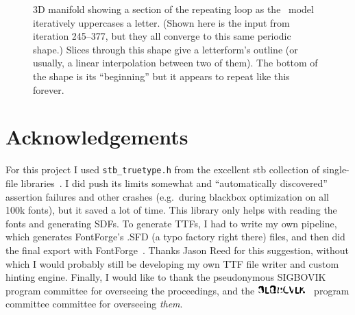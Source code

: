 \documentclass[twocolumn]{article}
\newcommand\upsigbovik{
  \includegraphics[height=1em]{upsigbovik}
}
\begin{document}
\begin{figure}[t]
\caption{ 3D manifold showing a section of the repeating loop as the
  \makeuppercase\ model iteratively uppercases a letter. (Shown here
  is the input  from iteration 245--377, but they all
  converge to this same periodic shape.) Slices through this shape give a
  letterform's outline (or usually, a linear interpolation between two
  of them). The bottom of the shape is its ``beginning'' but it
  appears to repeat like this forever.
} \label{fig:uppestcase3d}
\end{figure}



\section{Acknowledgements}

For this project I used \verb+stb_truetype.h+ from the excellent stb
collection of single-file libraries~\cite{stb}. I did push its limits
somewhat and ``automatically discovered'' assertion failures and other
crashes (e.g.~during blackbox optimization on all 100k fonts), but it
saved a lot of time. This library only helps with reading the fonts
and generating SDFs. To generate TTFs, I had to write my own pipeline,
which generates FontForge's .SFD (a typo factory right there) files,
and then did the final export with FontForge~\cite{fontforge}. Thanks
Jason Reed for this suggestion, without which I would probably still
be developing my own TTF file writer and custom hinting engine. Finally,
I would like to thank the pseudonymous SIGBOVIK program committee for
overseeing the proceedings, and the \upsigbovik\ program committee
committee for overseeing {\em them}.


{}

\end{document}
